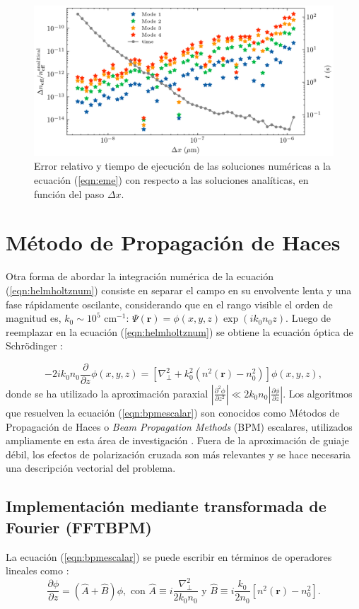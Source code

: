 \begin{figure}[H]
	\centering
	\includegraphics[width=0.8\linewidth]{media/numerical_slab}
	\caption[Error relativo y tiempo de ejecución.]{Error relativo y tiempo de ejecución de las soluciones numéricas a la ecuación (\ref{eqn:eme}) con respecto a las soluciones analíticas, en función del paso $\Delta x$. \label{fig:emenumerror}}
\end{figure}
\section{Método de Propagación de Haces} 

Otra forma de abordar la integración numérica de la ecuación (\ref{eqn:helmholtznum}) consiste en separar el campo en su envolvente lenta y una fase rápidamente oscilante, considerando que en el rango visible el orden de magnitud es, $k_0 \sim 10 ^{5} \text{ cm}^{-1}$: $\Psi(\textbf{r}) = \phi(x,y,z)\exp(ik_0 n_0 z)$. Luego de reemplazar en la ecuación (\ref{eqn:helmholtznum}) se obtiene la ecuación óptica de Schrödinger \citep{paraxialschrodinger}:

\begin{equation}
	-2ik_0 n_0\frac{\partial }{\partial z}\phi(x,y, z) =  \left[\nabla_\perp^2 + k_0^2 (n^2(\textbf{r})-n_0^2)\right]\phi(x,y, z), \label{eqn:bpmescalar}
\end{equation} 
donde se ha utilizado la aproximación paraxial $\left| \frac{\partial^2 \phi}{\partial z^2} \right| \ll 2 k_0 n_0\left| \frac{\partial \phi}{\partial z} \right|$. Los algoritmos que resuelven la ecuación (\ref{eqn:bpmescalar}) son conocidos como Métodos de Propagación de Haces o \textit{Beam Propagation Methods} (BPM) escalares, utilizados ampliamente en esta área de investigación \cite{bics, interorbital, OAMCaging, vortex, bpm}. Fuera de la aproximación de guiaje débil, los efectos de polarización cruzada son más relevantes y se hace necesaria una descripción vectorial del problema.
\subsection{Implementación mediante transformada de Fourier (FFTBPM)}
La ecuación (\ref{eqn:bpmescalar}) se puede escribir en términos de operadores lineales como \citep{bpm}: 
\begin{equation}
	\frac{\partial \phi}{\partial z}  = \left(\hat{A} + \hat{B}\right)\phi, \text{ con } \hat{A} \equiv i\frac{\nabla^2_\perp}{2k_0n_0}\text{ y } \hat{B} \equiv i\frac{k_0}{2n_0}\left[n^2(\textbf{r})-n_0^2\right]. \label{eqn:bpmop}
\end{equation}

